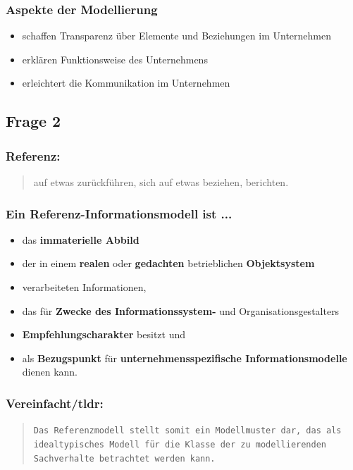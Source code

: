 \documentclass[a4paper]{article}
\begin{document}
			\hrulefill
			
			\raggedright
			
			\subsubsection{Aspekte der Modellierung}
			\begin{itemize}
				\item schaffen Transparenz über Elemente und Beziehungen im Unternehmen
				\item erklären Funktionsweise des Unternehmens
				\item erleichtert die Kommunikation im Unternehmen
			\end{itemize}
			
			\subsection{Frage 2}
			\label{le3-2}
			\subsubsection{Referenz:}
			\begin{quote}
				auf etwas zurückführen, sich auf etwas beziehen, berichten.
			\end{quote}
			\subsubsection{Ein Referenz-Informationsmodell ist ...}
			\begin{itemize}
				\item das \textbf{immaterielle Abbild}
				\item der in einem \textbf{realen} oder \textbf{gedachten} betrieblichen \textbf{Objektsystem}
				\item verarbeiteten Informationen,
				\item das für \textbf{Zwecke des Informationssystem-} und Organisationsgestalters
				\item \textbf{Empfehlungscharakter} besitzt und
				\item als \textbf{Bezugspunkt} für \textbf{unternehmensspezifische Informationsmodelle} dienen kann.
			\end{itemize}
			
			\subsubsection{Vereinfacht/tldr:}
			\begin{quote}
				\texttt{Das Referenzmodell stellt somit ein Modellmuster dar, das als idealtypisches Modell für die Klasse der zu modellierenden Sachverhalte betrachtet werden kann.}
			\end{quote}
			
\end{document}
